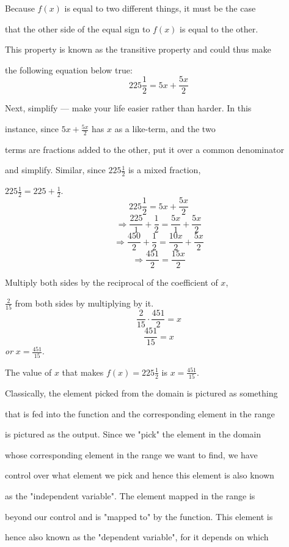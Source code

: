 Because $f(x)$ is equal to two different things, it must be the case

that the other side of the equal sign to $f(x)$ is equal to the other.

This property is known as the transitive property and could thus make

the following equation below true:$$225\frac{1}{2}=5x+\frac{5x}{2}$$



Next, simplify --- make your life easier rather than harder. In this

instance, since $5x+\frac{5x}{2}$ has $x$ as a like-term, and the two

terms are fractions added to the other, put it over a common denominator

and simplify. Similar, since $225\frac{1}{2}$ is a mixed fraction,

$225\frac{1}{2}=225+\frac{1}{2}$.$$225\frac{1}{2}=5x+\frac{5x}{2}$$$$\Rightarrow\frac{225}{1}+\frac{1}{2}=\frac{5x}{1}+\frac{5x}{2}$$$$\Rightarrow\frac{450}{2}+\frac{1}{2}=\frac{10x}{2}+\frac{5x}{2}$$$$\Rightarrow\frac{451}{2}=\frac{15x}{2}$$



Multiply both sides by the reciprocal of the coefficient of $x$,

$\frac{2}{15}$ from both sides by multiplying by it.$$\frac{2}{15}\cdot\frac{451}{2}=x$$$$\frac{451}{15}=x$$ \textit{or} $x=\frac{451}{15}$.



The value of $x$ that makes $f(x)=225\frac{1}{2}$ is $x=\frac{451}{15}$.



Classically, the element picked from the domain is pictured as something

that is fed into the function and the corresponding element in the range

is pictured as the output. Since we "pick" the element in the domain

whose corresponding element in the range we want to find, we have

control over what element we pick and hence this element is also known

as the "independent variable". The element mapped in the range is

beyond our control and is "mapped to" by the function. This element is

hence also known as the "dependent variable", for it depends on which

